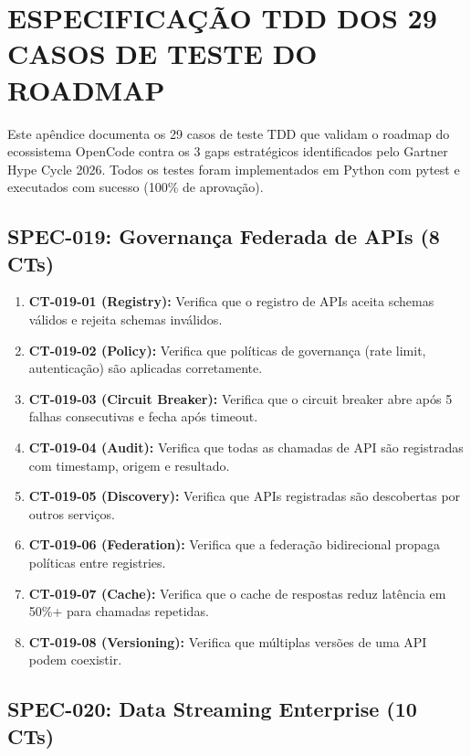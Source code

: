 \chapter{ESPECIFICAÇÃO TDD DOS 29 CASOS DE TESTE DO ROADMAP}
\label{ap:tdd}

Este apêndice documenta os 29 casos de teste TDD que validam o roadmap do ecossistema OpenCode contra os 3 gaps estratégicos identificados pelo Gartner Hype Cycle 2026. Todos os testes foram implementados em Python com pytest e executados com sucesso (100\% de aprovação).

\section{SPEC-019: Governança Federada de APIs (8 CTs)}

\begin{enumerate}
  \item \textbf{CT-019-01 (Registry):} Verifica que o registro de APIs aceita schemas válidos e rejeita schemas inválidos.
  \item \textbf{CT-019-02 (Policy):} Verifica que políticas de governança (rate limit, autenticação) são aplicadas corretamente.
  \item \textbf{CT-019-03 (Circuit Breaker):} Verifica que o circuit breaker abre após 5 falhas consecutivas e fecha após timeout.
  \item \textbf{CT-019-04 (Audit):} Verifica que todas as chamadas de API são registradas com timestamp, origem e resultado.
  \item \textbf{CT-019-05 (Discovery):} Verifica que APIs registradas são descobertas por outros serviços.
  \item \textbf{CT-019-06 (Federation):} Verifica que a federação bidirecional propaga políticas entre registries.
  \item \textbf{CT-019-07 (Cache):} Verifica que o cache de respostas reduz latência em 50\%+ para chamadas repetidas.
  \item \textbf{CT-019-08 (Versioning):} Verifica que múltiplas versões de uma API podem coexistir.
\end{enumerate}

\section{SPEC-020: Data Streaming Enterprise (10 CTs)}

